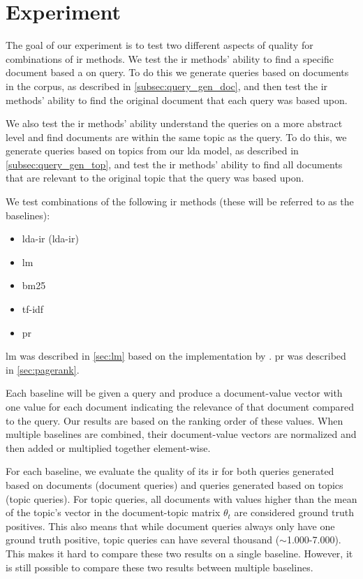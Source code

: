 \section{Experiment}\label{sec:experiment}

The goal of our experiment is to test two different aspects of quality for combinations of \gls{ir} methods.
We test the \gls{ir} methods' ability to find a specific document based a on query.
To do this we generate queries based on documents in the corpus, as described in \autoref{subsec:query_gen_doc}, and then test the \gls{ir} methods' ability to find the original document that each query was based upon.

We also test the \gls{ir} methods' ability understand the queries on a more abstract level and find documents are within the same topic as the query.
To do this, we generate queries based on topics from our \gls{lda} model, as described in \autoref{subsec:query_gen_top}, and test the \gls{ir} methods' ability to find all documents that are relevant to the original topic that the query was based upon.

We test combinations of the following \gls{ir} methods (these will be referred to as the baselines):
\begin{itemize}
	\item \acrlong{lda}-\acrlong{ir} (\acrshort{lda}-\acrshort{ir})
	\item \acrfull{lm}
	\item \acrfull{bm25}
	\item \acrfull{tf-idf}
	\item \acrfull{pr}
\end{itemize}

\gls{lm} was described in \autoref{sec:lm} based on the implementation by \citeauthor{yang2009topic}\cite{yang2009topic}.
\gls{pr} was described in \autoref{sec:pagerank}.



Each baseline will be given a query and produce a document-value vector with one value for each document indicating the relevance of that document compared to the query.
Our results are based on the ranking order of these values.
When multiple baselines are combined, their document-value vectors are normalized and then added or multiplied together element-wise.

For each baseline, we evaluate the quality of its \gls{ir} for both queries generated based on documents (document queries) and queries generated based on topics (topic queries).
For topic queries, all documents with values higher than the mean of the topic's vector in the document-topic matrix $\theta_t$ are considered ground truth positives.
This also means that while document queries always only have one ground truth positive, topic queries can have several thousand ($\sim$1.000-7.000).
This makes it hard to compare these two results on a single baseline.
However, it is still possible to compare these two results between multiple baselines.

